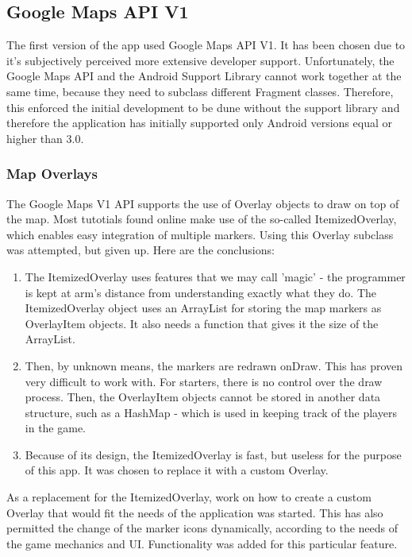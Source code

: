 \documentclass{article}
\begin{document}
\subsection{Google Maps API V1}

The first version of the app used Google Maps API V1. It has been chosen due to
it's subjectively perceived more extensive developer support.  Unfortunately,
the Google Maps API and the Android Support Library cannot work together at the
same time, because they need to subclass different Fragment classes. Therefore,
this enforced the initial development to be dune without the support library and
therefore the application has initially supported only Android versions equal or
higher than 3.0.

\subsubsection{Map Overlays}

The Google Maps V1 API supports the use of Overlay objects to draw on top
of the map. Most tutotials found online make use of the so-called
ItemizedOverlay, which enables easy integration of multiple markers. Using this
Overlay subclass was attempted, but given up. Here are the conclusions: \newline
\begin{enumerate}
  \item The ItemizedOverlay uses features that we may call 'magic' - the
  programmer is kept at arm's distance from understanding exactly what they do.
  The ItemizedOverlay object uses an ArrayList for storing the map markers as
  OverlayItem objects. It also needs a function that gives it the size of the
  ArrayList. 
  
  \item Then, by unknown means, the markers are redrawn onDraw. This has
  proven very difficult to work with. For starters, there is no control over the
  draw process. Then, the OverlayItem objects cannot be stored in another data
  structure, such as a HashMap - which is used in keeping track of the players
  in the game.
  
  \item Because of its design, the ItemizedOverlay is fast, but useless for the
  purpose of this app. It was chosen to replace it with a custom Overlay.   
\end{enumerate}

As a replacement for the ItemizedOverlay, work on how to create a custom Overlay
that would fit the needs of the application was started. This has also permitted
the change of the marker icons dynamically, according to the needs of the game
mechanics and UI. Functionality was added for this particular feature. \newline
\end{document}

